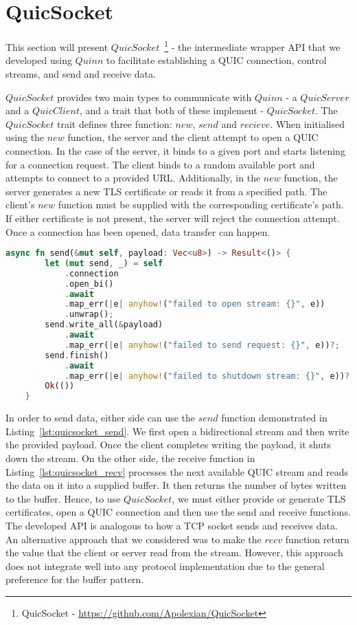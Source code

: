 \section{QuicSocket}\label{chapter:quic_socket}

This section will present $QuicSocket$~\footnote{QuicSocket - \url{https://github.com/Apolexian/QuicSocket}} - the intermediate wrapper API that we developed using $Quinn$ to facilitate establishing a QUIC connection, control streams, and send and receive data.

$QuicSocket$ provides two main types to communicate with $Quinn$ - a $QuicServer$ and a $QuicClient$, and a trait that both of these implement - $QuicSocket$.
The $QuicSocket$ trait defines three function: $new$, $send$ and $recieve$. 
When initialised using the $new$ function, the server and the client attempt to open a QUIC connection.
In the case of the server, it binds to a given port and starts listening for a connection request.
The client binds to a random available port and attempts to connect to a provided URL.
Additionally, in the $new$ function, the server generates a new TLS certificate or reads it from a specified path.
The client's $new$ function must be supplied with the corresponding certificate's path.
If either certificate is not present, the server will reject the connection attempt.
Once a connection has been opened, data transfer can happen.

\begin{lstlisting}[language=Rust, caption={The $send$ function that the $QuicClient$ and $QuicServer$ use for sending data. Data transfer is facilitated by opening a bidirectional stream on the pre-existing connection.}, label=lst:quicsocket_send]
    async fn send(&mut self, payload: Vec<u8>) -> Result<()> {
        let (mut send, _) = self
            .connection
            .open_bi()
            .await
            .map_err(|e| anyhow!("failed to open stream: {}", e))
            .unwrap();
        send.write_all(&payload)
            .await
            .map_err(|e| anyhow!("failed to send request: {}", e))?;
        send.finish()
            .await
            .map_err(|e| anyhow!("failed to shutdown stream: {}", e))?;
        Ok(())
    }
\end{lstlisting}

In order to send data, either side can use the $send$ function demonstrated in Listing~\ref{lst:quicsocket_send}.
We first open a bidirectional stream and then write the provided payload.
Once the client completes writing the payload, it shuts down the stream.
On the other side, the receive function in Listing~\ref{lst:quicsocket_recv} processes the next available QUIC stream and reads the data on it into a supplied buffer.
It then returns the number of bytes written to the buffer.
Hence, to use $QuicSocket$, we must either provide or generate TLS certificates, open a QUIC connection and then use the send and receive functions.
The developed API is analogous to how a TCP socket sends and receives data.
An alternative approach that we considered was to make the $recv$ function return the value that the client or server read from the stream.
However, this approach does not integrate well into any protocol implementation due to the general preference for the buffer pattern.


